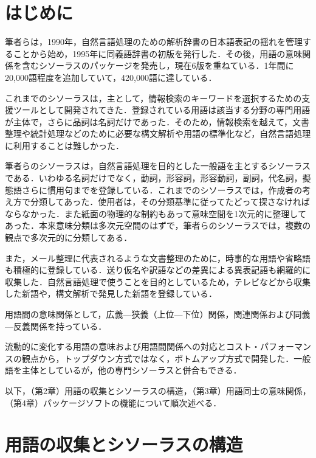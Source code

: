 \documentclass[japanese]{jnlp_1.4}
\begin{document}
\maketitle


\section{はじめに}

筆者らは，1990年，自然言語処理のための解析辞書の日本語表記の揺れを管理することから始め，1995年に同義語辞書の初版を発行した．その後，用語の意味関係を含むシソーラスのパッケージを発売し，現在6版を重ねている．1年間に20,000語程度を追加していて，420,000語に達している．

これまでのシソーラスは，主として，情報検索のキーワードを選択するための支援ツールとして開発されてきた．登録されている用語は該当する分野の専門用語が主体で，さらに品詞は名詞だけであった．そのため，情報検索を越えて，文書整理や統計処理などのために必要な構文解析や用語の標準化など，自然言語処理に利用することは難しかった．

筆者らのシソーラスは，自然言語処理を目的とした一般語を主とするシソーラスである．いわゆる名詞だけでなく，動詞，形容詞，形容動詞，副詞，代名詞，擬態語さらに慣用句までを登録している．これまでのシソーラスでは，作成者の考え方で分類してあった．使用者は，その分類基準に従ってたどって探さなければならなかった．また紙面の物理的な制約もあって意味空間を1次元的に整理してあった．本来意味分類は多次元空間のはずで，筆者らのシソーラスでは，複数の観点で多次元的に分類してある．

また，メール整理に代表されるような文書整理のために，時事的な用語や省略語も積極的に登録している．送り仮名や訳語などの差異による異表記語も網羅的に収集した．自然言語処理で使うことを目的としているため，テレビなどから収集した新語や，構文解析で発見した新語を登録している．

用語間の意味関係として，広義—狭義（上位—下位）関係，関連関係および同義—反義関係を持っている．

流動的に変化する用語の意味および用語間関係への対応とコスト・パフォーマンスの観点から，トップダウン方式ではなく，ボトムアップ方式で開発した．一般語を主体としているが，他の専門シソーラスと併合もできる．

以下，（第2章）用語の収集とシソーラスの構造，（第3章）用語同士の意味関係，（第4章）パッケージソフトの機能について順次述べる．



\section{用語の収集とシソーラスの構造}
\end{document}
